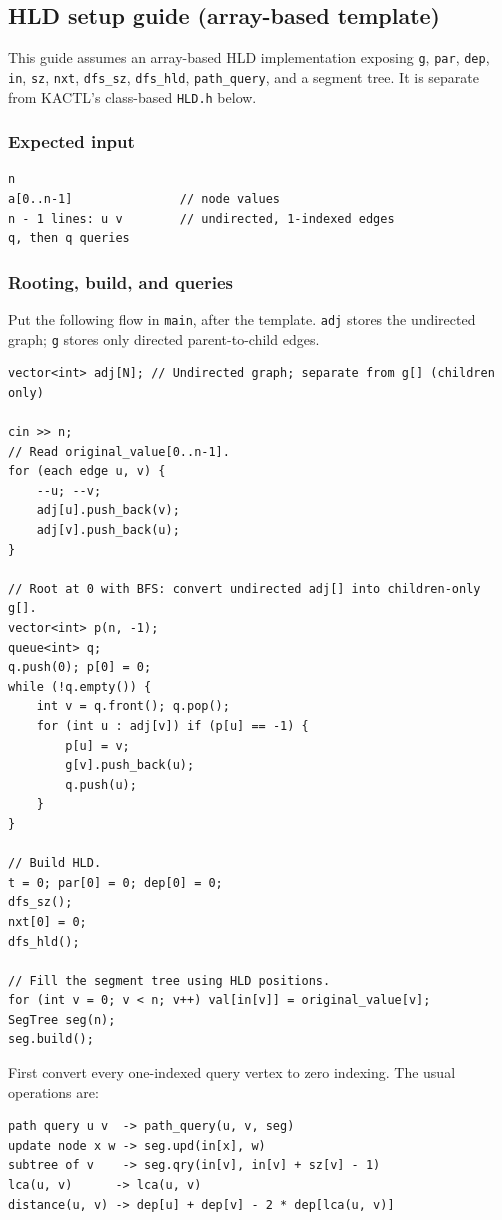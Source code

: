 \subsection{HLD setup guide (array-based template)}

This guide assumes an array-based HLD implementation exposing \texttt{g}, \texttt{par}, \texttt{dep}, \texttt{in}, \texttt{sz}, \texttt{nxt}, \texttt{dfs\_sz}, \texttt{dfs\_hld}, \texttt{path\_query}, and a segment tree. It is separate from KACTL's class-based \texttt{HLD.h} below.

\subsubsection{Expected input}
\begin{lstlisting}
n
a[0..n-1]               // node values
n - 1 lines: u v        // undirected, 1-indexed edges
q, then q queries
\end{lstlisting}

\subsubsection{Rooting, build, and queries}
Put the following flow in \texttt{main}, after the template. \texttt{adj} stores the undirected graph; \texttt{g} stores only directed parent-to-child edges.

\begin{lstlisting}
vector<int> adj[N]; // Undirected graph; separate from g[] (children only)

cin >> n;
// Read original_value[0..n-1].
for (each edge u, v) {
    --u; --v;
    adj[u].push_back(v);
    adj[v].push_back(u);
}

// Root at 0 with BFS: convert undirected adj[] into children-only g[].
vector<int> p(n, -1);
queue<int> q;
q.push(0); p[0] = 0;
while (!q.empty()) {
    int v = q.front(); q.pop();
    for (int u : adj[v]) if (p[u] == -1) {
        p[u] = v;
        g[v].push_back(u);
        q.push(u);
    }
}

// Build HLD.
t = 0; par[0] = 0; dep[0] = 0;
dfs_sz();
nxt[0] = 0;
dfs_hld();

// Fill the segment tree using HLD positions.
for (int v = 0; v < n; v++) val[in[v]] = original_value[v];
SegTree seg(n);
seg.build();
\end{lstlisting}

First convert every one-indexed query vertex to zero indexing. The usual operations are:
\begin{lstlisting}
path query u v  -> path_query(u, v, seg)
update node x w -> seg.upd(in[x], w)
subtree of v    -> seg.qry(in[v], in[v] + sz[v] - 1)
lca(u, v)      -> lca(u, v)
distance(u, v) -> dep[u] + dep[v] - 2 * dep[lca(u, v)]
\end{lstlisting}

